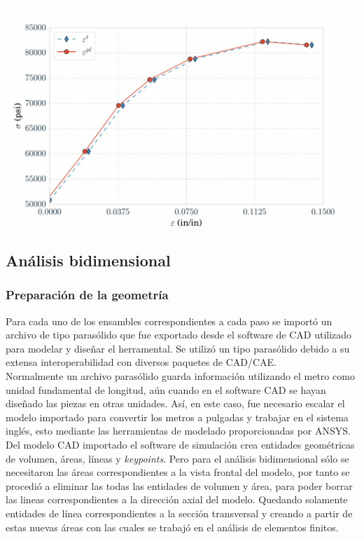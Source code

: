 \begin{center}
\includegraphics[scale=0.6]{src/ch3/ls_dyna_material_curve.pdf}
\label{fig:ls_dyna_material_curve}
\end{center}

\subsection{Análisis bidimensional}

\subsubsection{Preparación de la geometría}

Para cada uno de los ensambles correspondientes a cada paso se importó un archivo de tipo parasólido 
que fue exportado desde el software de CAD utilizado para modelar y diseñar el herramental. Se utilizó 
un tipo parasólido debido a su extensa interoperabilidad con diversos paquetes de CAD/CAE. ~\cite{parasolid-reference} \\

Normalmente un archivo parasólido guarda información utilizando el metro como unidad fundamental 
de longitud, aún cuando en el software CAD se hayan diseñado las piezas en otras unidades. 
Así, en este caso, fue necesario escalar el modelo importado para convertir los metros a pulgadas 
y trabajar en el sistema inglés, esto mediante las herramientas de modelado proporcionadas por 
ANSYS\CR. \\

Del modelo CAD importado el software de simulación crea entidades geométricas de volumen, áreas, 
líneas y \textit{keypoints}. Pero para el análisis bidimensional sólo se necesitaron las áreas 
correspondientes a la vista frontal del modelo, por tanto se procedió a eliminar las todas las entidades 
de volumen y área, para poder borrar las lineas correspondientes a la dirección axial del modelo.
Quedando solamente entidades de línea correspondientes a la sección transversal y creando  
a partir de estas nuevas áreas con las cuales se trabajó en el análisis de elementos finitos.


